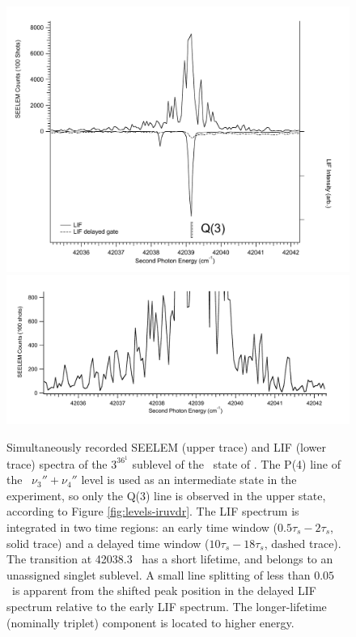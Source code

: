 \documentclass[12pt]{mitthesis}
\begin{document}
\begin{figure}
  \caption{Simultaneously recorded SEELEM (upper trace) and LIF (lower
    trace) spectra of the $3^36^1$  sublevel of the \astate\
    state of .  The P(4) line of the \xstate\ $\nu_3'' +
    \nu_4''$ level is used as an intermediate state in the experiment,
    so only the Q(3) line is observed in the upper state, according to
    Figure \ref{fig:levels-iruvdr}.  The LIF spectrum is integrated in
    two time regions: an early time window ($0.5\tau_s-2\tau_s$, solid
    trace) and a delayed time window ($10\tau_s-18\tau_s$, dashed
    trace).  The transition at 42038.3 \rcm\ has a short lifetime, and
    belongs to an unassigned singlet sublevel.  A small line splitting
    of less than $0.05$ \rcm\ is apparent from the shifted peak
    position in the delayed LIF spectrum relative to the early LIF
    spectrum.  The longer-lifetime (nominally triplet) component is
    located to higher energy.}
  \label{fig:3361-q3}
  \centering
  \includegraphics[width=6in]{spectrum-3361-q3-split.pdf}
  \includegraphics[width=6in]{spectrum-3361-q3-zoom.pdf}
\end{figure}
\end{document}

